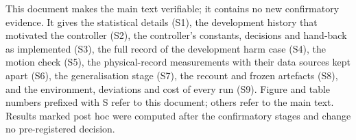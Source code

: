 This document makes the main text verifiable; it contains no new confirmatory evidence. It gives the statistical details (S1), the development history that motivated the controller (S2), the controller's constants, decisions and hand-back as implemented (S3), the full record of the development harm case (S4), the motion check (S5), the physical-record measurements with their data sources kept apart (S6), the generalisation stage (S7), the recount and frozen artefacts (S8), and the environment, deviations and cost of every run (S9). Figure and table numbers prefixed with S refer to this document; others refer to the main text. Results marked post hoc were computed after the confirmatory stages and change no pre-registered decision.
